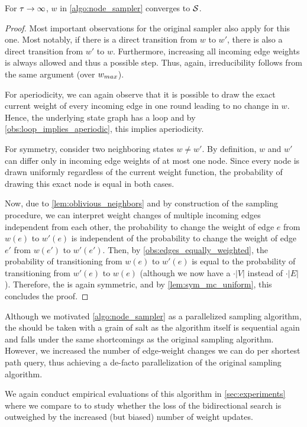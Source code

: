 \begin{theorem}\label{thm:node_sampler_is_uniform}
    For $\tau \rightarrow \infty$, $w$ in \cref{algo:node_sampler} converges to $\mathcal{S}$.  
\end{theorem}
\begin{proof}
    Most important observations for the original sampler also apply for this one.
    Most notably, if there is a direct transition from $w$ to $w'$, there is also a direct transition from $w'$ to $w$.
    Furthermore, increasing all incoming edge weights is always allowed and thus a possible step.
    Thus, again, irreducibility follows from the same argument (over $w_{max}$).

    For aperiodicity, we can again observe that it is possible to draw the exact current weight of every incoming edge in one round leading to no change in $w$.
    Hence, the underlying state graph has a loop and by \cref{obs:loop_implies_aperiodic}, this implies aperiodicity.

    For symmetry, consider two neighboring states $w \neq w'$.
    By definition, $w$ and $w'$ can differ only in incoming edge weights of at most one node.
    Since every node is drawn uniformly regardless of the current weight function, the probability of drawing this exact node is equal in both cases.

    Now, due to \cref{lem:oblivious_neighbors} and by construction of the sampling procedure, we can interpret weight changes of multiple incoming edges independent from each other, \ie the probability to change the weight of edge $e$ from $w(e)$ to $w'(e)$ is independent of the probability to change the weight of edge $e'$ from $w(e')$ to $w'(e')$.
    Then, by \cref{obs:edges_equally_weighted}, the probability of transitioning from $w(e)$ to $w'(e)$ is equal to the probability of transitioning from $w'(e)$ to $w(e)$ (although we now have a $\cdot |V|$ instead of $\cdot |E|$).
    Therefore, the \markov is again symmetric, and by \cref{lem:sym_mc_uniform}, this concludes the proof.
\end{proof}

Although we motivated \cref{algo:node_sampler} as a parallelized sampling algorithm, the  should be taken with a grain of salt as the algorithm itself is sequential again and falls under the same shortcomings as the original sampling algorithm.
However, we increased the number of edge-weight changes we can do per shortest path query, thus achieving a de-facto parallelization of the original sampling algorithm.

We again conduct empirical evaluations of this algorithm in \cref{sec:experiments} where we compare \algns to \algbp to study whether the loss of the bidirectional search is outweighed by the increased (but biased) number of weight updates.


